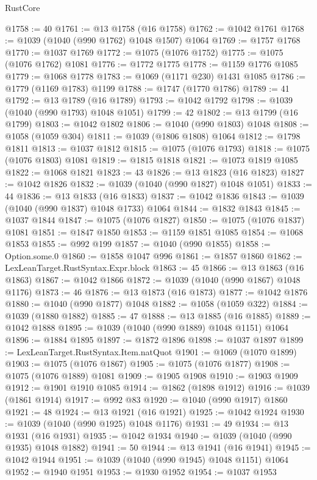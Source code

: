 \begin{lexlean}{RustCore}
\begin{coremodule}
@1758 := 40
@1761 := @13 @1758 (@16 @1758)
@1762 := @1042 @1761
@1768 := @1039 (@1040 (@990 @1762) @1048 @1507) @1064
@1769 := @1757 @1768
@1770 := @1037 @1769
@1772 := @1075 (@1076 @1752)
@1775 := @1075 (@1076 @1762) @1081
@1776 := @1772 @1775
@1778 := @1159 @1776 @1085
@1779 := @1068 @1778
@1783 := @1069 (@1171 @230) @1431 @1085
@1786 := @1779 (@1169 @1783) @1199
@1788 := @1747 (@1770 @1786)
@1789 := 41
@1792 := @13 @1789 (@16 @1789)
@1793 := @1042 @1792
@1798 := @1039 (@1040 (@990 @1793) @1048 @1051)
@1799 := 42
@1802 := @13 @1799 (@16 @1799)
@1803 := @1042 @1802
@1806 := @1040 (@990 @1803) @1048
@1808 := @1058 (@1059 @304)
@1811 := @1039 (@1806 @1808) @1064
@1812 := @1798 @1811
@1813 := @1037 @1812
@1815 := @1075 (@1076 @1793)
@1818 := @1075 (@1076 @1803) @1081
@1819 := @1815 @1818
@1821 := @1073 @1819 @1085
@1822 := @1068 @1821
@1823 := 43
@1826 := @13 @1823 (@16 @1823)
@1827 := @1042 @1826
@1832 := @1039 (@1040 (@990 @1827) @1048 @1051)
@1833 := 44
@1836 := @13 @1833 (@16 @1833)
@1837 := @1042 @1836
@1843 := @1039 (@1040 (@990 @1837) @1048 @1733) @1064
@1844 := @1832 @1843
@1845 := @1037 @1844
@1847 := @1075 (@1076 @1827)
@1850 := @1075 (@1076 @1837) @1081
@1851 := @1847 @1850
@1853 := @1159 @1851 @1085
@1854 := @1068 @1853
@1855 := @992 @199
@1857 := @1040 (@990 @1855)
@1858 := Option.some.{0}
@1860 := @1858 @1047 @996
@1861 := @1857 @1860
@1862 := LexLeanTarget.RustSyntax.Expr.block
@1863 := 45
@1866 := @13 @1863 (@16 @1863)
@1867 := @1042 @1866
@1872 := @1039 (@1040 (@990 @1867) @1048 @1176)
@1873 := 46
@1876 := @13 @1873 (@16 @1873)
@1877 := @1042 @1876
@1880 := @1040 (@990 @1877) @1048
@1882 := @1058 (@1059 @322)
@1884 := @1039 (@1880 @1882)
@1885 := 47
@1888 := @13 @1885 (@16 @1885)
@1889 := @1042 @1888
@1895 := @1039 (@1040 (@990 @1889) @1048 @1151) @1064
@1896 := @1884 @1895
@1897 := @1872 @1896
@1898 := @1037 @1897
@1899 := LexLeanTarget.RustSyntax.Item.natQuot
@1901 := @1069 (@1070 @1899)
@1903 := @1075 (@1076 @1867)
@1905 := @1075 (@1076 @1877)
@1908 := @1075 (@1076 @1889) @1081
@1909 := @1905 @1908
@1910 := @1903 @1909
@1912 := @1901 @1910 @1085
@1914 := @1862 (@1898 @1912)
@1916 := @1039 (@1861 @1914)
@1917 := @992 @83
@1920 := @1040 (@990 @1917) @1860
@1921 := 48
@1924 := @13 @1921 (@16 @1921)
@1925 := @1042 @1924
@1930 := @1039 (@1040 (@990 @1925) @1048 @1176)
@1931 := 49
@1934 := @13 @1931 (@16 @1931)
@1935 := @1042 @1934
@1940 := @1039 (@1040 (@990 @1935) @1048 @1882)
@1941 := 50
@1944 := @13 @1941 (@16 @1941)
@1945 := @1042 @1944
@1951 := @1039 (@1040 (@990 @1945) @1048 @1151) @1064
@1952 := @1940 @1951
@1953 := @1930 @1952
@1954 := @1037 @1953

\end{coremodule}
\end{lexlean}

